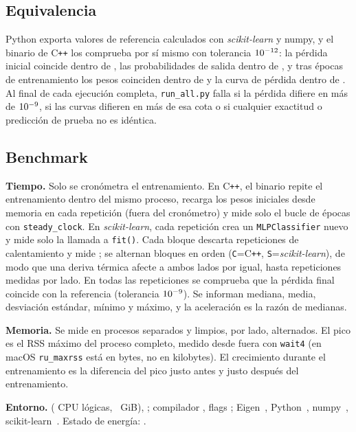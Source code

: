 \documentclass[11pt,a4paper]{article}
\newcommand{\cpp}{C\texttt{++}\xspace}
\newcommand{\sk}{\textit{scikit-learn}\xspace}
\begin{document}
\subsection{Equivalencia}\label{sec:equiv}
Python exporta valores de referencia calculados con \sk y numpy, y el binario de \cpp los comprueba por s\'i mismo con tolerancia $10^{-12}$: la p\'erdida inicial coincide dentro de \initLossDiff{}, las probabilidades de salida dentro de \probaDiff{}, y tras \checkEpochs{} \'epocas de entrenamiento los pesos coinciden dentro de \weightsDiff{} y la curva de p\'erdida dentro de \curveTwentyDiff{}. Al final de cada ejecuci\'on completa, \texttt{run\_all.py} falla si la p\'erdida difiere en m\'as de $10^{-9}$, si las curvas difieren en m\'as de esa cota o si cualquier exactitud o predicci\'on de prueba no es id\'entica.

\subsection{Benchmark}
\textbf{Tiempo.} Solo se cron\'ometra el entrenamiento. En \cpp, el binario repite el entrenamiento dentro del mismo proceso, recarga los pesos iniciales desde memoria en cada repetici\'on (fuera del cron\'ometro) y mide solo el bucle de \'epocas con \texttt{steady\_clock}. En \sk, cada repetici\'on crea un \texttt{MLPClassifier} nuevo y mide solo la llamada a \texttt{fit()}. Cada bloque descarta \nWarmup{} repeticiones de calentamiento y mide \repsPerBlock{}; se alternan \nBlocks{} bloques en orden \blockOrder{} (\texttt{C}=\cpp, \texttt{S}=\sk), de modo que una deriva t\'ermica afecte a ambos lados por igual, hasta \nReps{} repeticiones medidas por lado. En todas las repeticiones se comprueba que la p\'erdida final coincide con la referencia (tolerancia $10^{-9}$). Se informan mediana, media, desviaci\'on est\'andar, m\'inimo y m\'aximo, y la aceleraci\'on es la raz\'on de medianas.

\textbf{Memoria.} Se mide en procesos separados y limpios, \nMemRuns{} por lado, alternados. El pico es el RSS m\'aximo del proceso completo, medido desde fuera con \texttt{wait4} (en macOS \texttt{ru\_maxrss} est\'a en bytes, no en kilobytes). El crecimiento durante el entrenamiento es la diferencia del pico justo antes y justo despu\'es del entrenamiento.

\textbf{Entorno.} \envCpu{} (\envCpus{} CPU l\'ogicas, \envRamGiB{}~GiB), \envOs{}; compilador \envCompiler{}, flags \envFlags{}; Eigen~\envEigen{}, Python~\envPython{}, numpy~\envNumpy{}, scikit-learn~\envSklearn{}. Estado de energ\'ia: \envPower{}.
\end{document}
